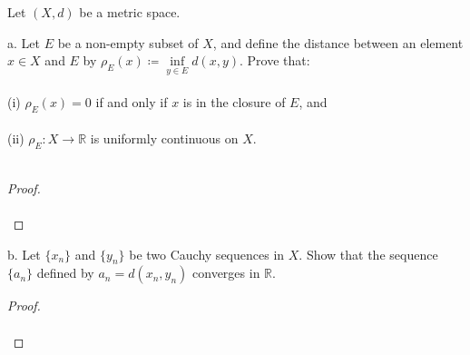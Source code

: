 Let $(X, d)$ be a metric space.

a.  Let $E$ be a non-empty subset of $X$, and define the distance between an
    element $x \in X$ and $E$ by
    $\rho_E(x) \coloneqq \inf\limits_{y \in E}{d(x, y)}$.  Prove that: \ \\\\
    (i) $\rho_E(x) = 0$ if and only if $x$ is in the closure of $E$, and \ \\\\
    (ii) $\rho_E:X \to \mathbb{R}$ is uniformly continuous on $X$.\ \\\\

    \begin{proof}\renewcommand{\qedsymbol}{}\ \\\\
    \end{proof}

    \pagebreak

b.  Let $\{x_n\}$ and $\{y_n\}$ be two Cauchy sequences in $X$. Show that the
    sequence $\{a_n\}$ defined by $a_n = d(x_n, y_n)$ converges in $\mathbb{R}.$
    \ \\

    \begin{proof}\renewcommand{\qedsymbol}{}\ \\\\
    \end{proof}

    \pagebreak
